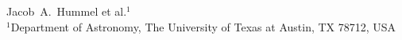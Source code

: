 Jacob~A.~Hummel et al.$^{1}$\\
$^1$Department of Astronomy, The University of Texas at Austin, TX 78712, USA